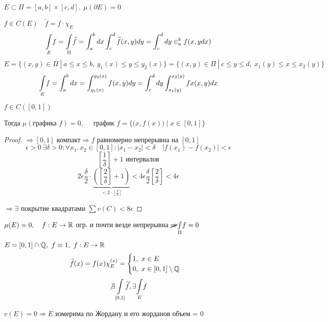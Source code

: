     \begin{illustration}
        $E \subset \Pi = [a, b] \times [c, d], \ \mu (\partial E) = 0$
        \par $f \in C(E) \quad \widetilde{f} = f \cdot \chi_E$
        \[
            \underset{E}{\int} f = \underset{\Pi}{\int} \widetilde{f} = \int_a^b dx \int_c^d \widetilde{f}(x, y)dy = \int_c^d dy \in_a^b f(x, ydx)    
        \]
        \[
            E = \{(x, y) \in \Pi \ | \ a \le x \le b, \ y_1(x) \le y \le y_2(x)\} = \{(x, y) \in \Pi \ | \ c \le y \le d , \ x_1(y) \le x \le x_2(y)\}   
        \]
        \[
            \underset{E}{\int} f = \int_a^b dx = \int_{y_1(x)}^{y_2(x)} f(x, y) dy = \int_c^d dy \int_{x_1(y)}^{x_2(y)} fx(x, y)dx    
        \]
    \end{illustration}

    \begin{remark}
        $f \in C([0, 1])$
        \par Тогда $\mu(\text{графика } f) = 0, \quad$ график $f = \{\big(x, f(x)\big) \mid x \in [0, 1]\}$
    \end{remark}
    \begin{proof}
        $\Rightarrow [0, 1] \text{ компакт} \Rightarrow f $ равномерно непрерывна на $[0, 1]$
        \[
            \epsilon > 0 \ \exists \delta > 0 : \forall x_1, x_2 \in [0, 1] : |x_1 - x_2| < \delta \quad |f(x_1) - f(x_2)| < \epsilon
        \]
        \[
            \left[\frac 1 \delta\right] + 1 \text{ интервалов}    
        \]
        \[
            2\epsilon \frac \delta 2 \cdot \underbrace{\left(\left[\frac 2 \delta\right] + 1\right)}_{< 2 \cdot \left[\frac 2 \delta\right]} < 4 \epsilon \frac \delta 2 \left[\frac 2 \delta\right] < 4 \epsilon
        \] %
        \par {}
        \par {} %
        \par $\Rightarrow \exists$ покрытие квадратами $\sum v(C) < 8 \epsilon$
    \end{proof}

    $\mu(E) = 0, \quad f : E \rightarrow \mathbb{R}$ огр. и почти везде непрерывна $\cancel \Rightarrow \underset{\Pi}{\int} f = 0$
    \par $E = [0,1] \cap \mathbb{Q}, \ f \equiv 1, \ f : E \rightarrow \mathbb{R}$
    \[
        \widetilde f(x) = f(x)\chi_E^{(x)} = \begin{cases}
            1, \ x\in E \\
            0, \ x \in [0,1] \setminus \mathbb{Q}
        \end{cases}    
    \]
    \[
        \not\exists \underset{[0, 1]}{\int} \widetilde f, \exists \underset{E}{\int}f    
    \]
    \begin{proposition}
        \par $v(E) = 0 \Rightarrow E$ измерима по Жордану и его жорданов объем = 0
    \end{proposition}

